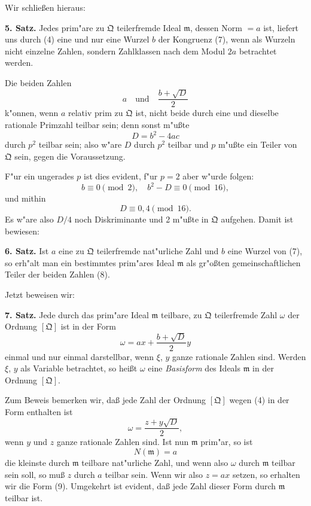 \documentclass[12pt,a4paper]{article}
\theoremstyle{plain}
\begin{document}
Wir schlie\ss en hieraus:

\textbf{5. Satz.} Jedes prim"are zu $\mathfrak{Q}$ teilerfremde Ideal $\mathfrak{m}$, dessen Norm $= a$ ist, liefert uns durch (4) eine und nur eine Wurzel $b$ der Kongruenz (7), wenn als Wurzeln nicht einzelne Zahlen, sondern Zahlklassen nach dem Modul $2a$ betrachtet werden.

Die beiden Zahlen
\[
a\quad \text{und}\quad \frac{b + \sqrt{D}}{2}
\]
k"onnen, wenn $a$ relativ prim zu $\mathfrak{Q}$ ist, nicht beide durch eine und dieselbe rationale Primzahl teilbar sein; denn sonst m"u\ss te
\[
D = b^2 - 4ac
\]
durch $p^2$ teilbar sein; also w"are $D$ durch $p^2$ teilbar und $p$ m"u\ss te ein Teiler von $\mathfrak{Q}$ sein, gegen die Voraussetzung.

F"ur ein ungerades $p$ ist dies evident, f"ur $p = 2$ aber w"urde folgen:
\[
b \equiv 0 \pmod{2},\quad b^2 - D \equiv 0 \pmod{16},
\]
und mithin
\[
D \equiv 0, 4 \pmod{16}.
\]
Es w"are also $D/4$ noch Diskriminante und 2 m"u\ss te in $\mathfrak{Q}$ aufgehen. Damit ist bewiesen:

\textbf{6. Satz.} Ist $a$ eine zu $\mathfrak{Q}$ teilerfremde nat"urliche Zahl und $b$ eine Wurzel von (7), so erh"alt man ein bestimmtes prim"ares Ideal $\mathfrak{m}$ als gr"o\ss ten gemeinschaftlichen Teiler der beiden Zahlen (8).

Jetzt beweisen wir:

\textbf{7. Satz.} Jede durch das prim"are Ideal $\mathfrak{m}$ teilbare, zu $\mathfrak{Q}$ teilerfremde Zahl $\omega$ der Ordnung $[\mathfrak{Q}]$ ist in der Form
\begin{equation}
\omega = ax + \frac{b + \sqrt{D}}{2}y
\tag{9}
\end{equation}
einmal und nur einmal darstellbar, wenn $\xi$, $y$ ganze rationale Zahlen sind. Werden $\xi$, $y$ als Variable betrachtet, so hei\ss t $\omega$ eine \textit{Basisform} des Ideals $\mathfrak{m}$ in der Ordnung $[\mathfrak{Q}]$.

Zum Beweis bemerken wir, da\ss{} jede Zahl der Ordnung $[\mathfrak{Q}]$ wegen (4) in der Form enthalten ist
\begin{equation}
\omega = \frac{z + y\sqrt{D}}{2},
\tag{10}
\end{equation}
wenn $y$ und $z$ ganze rationale Zahlen sind. Ist nun $\mathfrak{m}$ prim"ar, so ist
\begin{equation}
N(\mathfrak{m}) = a
\tag{11}
\end{equation}
die kleinste durch $\mathfrak{m}$ teilbare nat"urliche Zahl, und wenn also $\omega$ durch $\mathfrak{m}$ teilbar sein soll, so mu\ss{} $z$ durch $a$ teilbar sein. Wenn wir also $z = ax$ setzen, so erhalten wir die Form (9). Umgekehrt ist evident, da\ss{} jede Zahl dieser Form durch $\mathfrak{m}$ teilbar ist.
\end{document}
